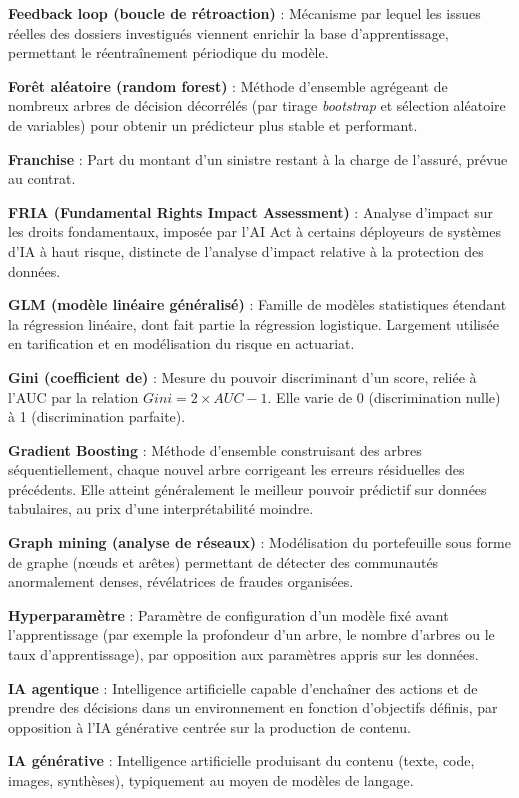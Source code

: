 \textbf{Feedback loop (boucle de rétroaction)} : Mécanisme par lequel les issues réelles des dossiers investigués viennent enrichir la base d'apprentissage, permettant le réentraînement périodique du modèle.

\textbf{Forêt aléatoire (random forest)} : Méthode d'ensemble agrégeant de nombreux arbres de décision décorrélés (par tirage \textit{bootstrap} et sélection aléatoire de variables) pour obtenir un prédicteur plus stable et performant.

\textbf{Franchise} : Part du montant d'un sinistre restant à la charge de l'assuré, prévue au contrat.

\textbf{FRIA (Fundamental Rights Impact Assessment)} : Analyse d'impact sur les droits fondamentaux, imposée par l'AI Act à certains déployeurs de systèmes d'IA à haut risque, distincte de l'analyse d'impact relative à la protection des données.

\textbf{GLM (modèle linéaire généralisé)} : Famille de modèles statistiques étendant la régression linéaire, dont fait partie la régression logistique. Largement utilisée en tarification et en modélisation du risque en actuariat.

\textbf{Gini (coefficient de)} : Mesure du pouvoir discriminant d'un score, reliée à l'AUC par la relation $Gini = 2 \times AUC - 1$. Elle varie de 0 (discrimination nulle) à 1 (discrimination parfaite).

\textbf{Gradient Boosting} : Méthode d'ensemble construisant des arbres séquentiellement, chaque nouvel arbre corrigeant les erreurs résiduelles des précédents. Elle atteint généralement le meilleur pouvoir prédictif sur données tabulaires, au prix d'une interprétabilité moindre.

\textbf{Graph mining (analyse de réseaux)} : Modélisation du portefeuille sous forme de graphe (nœuds et arêtes) permettant de détecter des communautés anormalement denses, révélatrices de fraudes organisées.

\textbf{Hyperparamètre} : Paramètre de configuration d'un modèle fixé avant l'apprentissage (par exemple la profondeur d'un arbre, le nombre d'arbres ou le taux d'apprentissage), par opposition aux paramètres appris sur les données.

\textbf{IA agentique} : Intelligence artificielle capable d'enchaîner des actions et de prendre des décisions dans un environnement en fonction d'objectifs définis, par opposition à l'IA générative centrée sur la production de contenu.

\textbf{IA générative} : Intelligence artificielle produisant du contenu (texte, code, images, synthèses), typiquement au moyen de modèles de langage.

